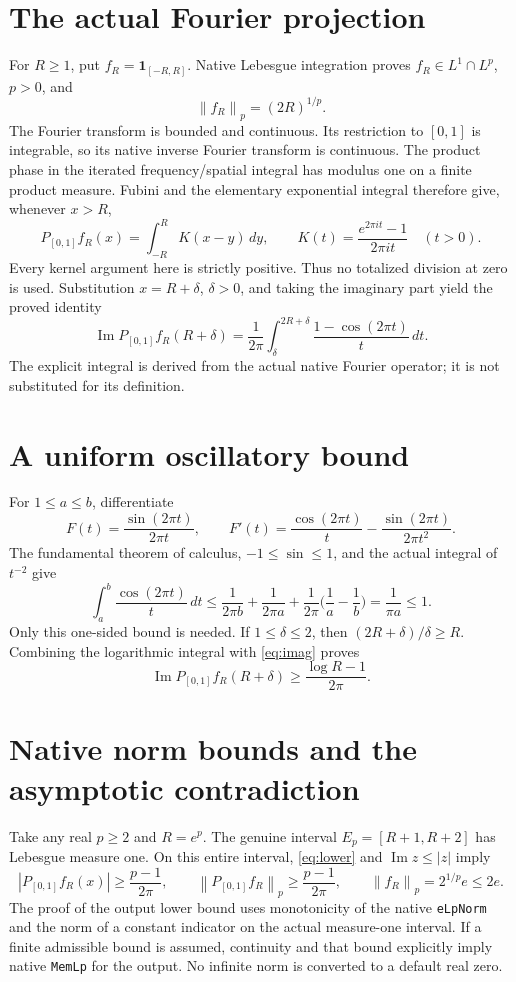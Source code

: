 \documentclass[10pt,a4paper]{article}
\newcommand{\ind}{\mathbf 1}
\newcommand{\norm}[1]{\left\lVert #1\right\rVert}
\begin{document}
\section{The actual Fourier projection}
For \(R\ge1\), put \(f_R=\ind_{[-R,R]}\). Native Lebesgue integration proves \(f_R\in L^1\cap L^p\), \(p>0\), and
\[
 \norm{f_R}_p=(2R)^{1/p}.
\]
The Fourier transform is bounded and continuous. Its restriction to \([0,1]\) is integrable, so its native inverse Fourier transform is continuous. The product phase in the iterated frequency/spatial integral has modulus one on a finite product measure. Fubini and the elementary exponential integral therefore give, whenever \(x>R\),
\[
 P_{[0,1]}f_R(x)=\int_{-R}^{R} K(x-y)\,dy,
 \qquad K(t)=\frac{e^{2\pi i t}-1}{2\pi i t}\quad(t>0).
\]
Every kernel argument here is strictly positive. Thus no totalized division at zero is used. Substitution \(x=R+\delta\), \(\delta>0\), and taking the imaginary part yield the proved identity
\begin{equation}\label{eq:imag}
 \operatorname{Im}P_{[0,1]}f_R(R+\delta)
 =\frac1{2\pi}\int_\delta^{2R+\delta}\frac{1-\cos(2\pi t)}t\,dt.
\end{equation}
The explicit integral is derived from the actual native Fourier operator; it is not substituted for its definition.

\section{A uniform oscillatory bound}
For \(1\le a\le b\), differentiate
\[
 F(t)=\frac{\sin(2\pi t)}{2\pi t},\qquad
 F'(t)=\frac{\cos(2\pi t)}t-\frac{\sin(2\pi t)}{2\pi t^2}.
\]
The fundamental theorem of calculus, \(-1\le\sin\le1\), and the actual integral of \(t^{-2}\) give
\[
 \int_a^b\frac{\cos(2\pi t)}t\,dt
 \le\frac1{2\pi b}+\frac1{2\pi a}
   +\frac1{2\pi}\Big(\frac1a-\frac1b\Big)
 =\frac1{\pi a}\le1.
\]
Only this one-sided bound is needed. If \(1\le\delta\le2\), then
\((2R+\delta)/\delta\ge R\). Combining the logarithmic integral with \eqref{eq:imag} proves
\begin{equation}\label{eq:lower}
 \operatorname{Im}P_{[0,1]}f_R(R+\delta)
 \ge\frac{\log R-1}{2\pi}.
\end{equation}

\section{Native norm bounds and the asymptotic contradiction}
Take any real \(p\ge2\) and \(R=e^p\). The genuine interval
\(E_p=[R+1,R+2]\) has Lebesgue measure one. On this entire interval, \eqref{eq:lower} and \(\operatorname{Im}z\le|z|\) imply
\[
 |P_{[0,1]}f_R(x)|\ge\frac{p-1}{2\pi},\qquad
 \norm{P_{[0,1]}f_R}_p\ge\frac{p-1}{2\pi},\qquad
 \norm{f_R}_p=2^{1/p}e\le2e.
\]
The proof of the output lower bound uses monotonicity of the native \texttt{eLpNorm} and the norm of a constant indicator on the actual measure-one interval. If a finite admissible bound is assumed, continuity and that bound explicitly imply native \texttt{MemLp} for the output. No infinite norm is converted to a default real zero.
\end{document}
